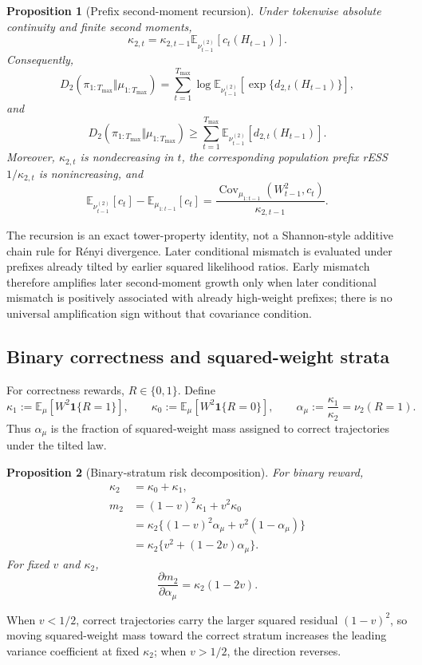 \documentclass[10pt]{article}
\newtheorem{proposition}{Proposition}
\theoremstyle{remark}
\newcommand{\E}{\mathbb{E}}
\newcommand{\Cov}{\operatorname{Cov}}
\newcommand{\ind}{\mathbf{1}}
\begin{document}
\begin{proposition}[Prefix second-moment recursion]
Under tokenwise absolute continuity and finite second moments,
\begin{equation}
\kappa_{2,t}=\kappa_{2,t-1}\E_{\nu_{t-1}^{(2)}}[c_t(H_{t-1})].
\end{equation}
Consequently,
\begin{equation}
D_2(\pi_{1:T_{\max}}\Vert\mu_{1:T_{\max}})
=\sum_{t=1}^{T_{\max}}\log\E_{\nu_{t-1}^{(2)}}[\exp\{d_{2,t}(H_{t-1})\}],
\end{equation}
and
\begin{equation}
D_2(\pi_{1:T_{\max}}\Vert\mu_{1:T_{\max}})
\ge \sum_{t=1}^{T_{\max}}\E_{\nu_{t-1}^{(2)}}[d_{2,t}(H_{t-1})].
\end{equation}
Moreover, $\kappa_{2,t}$ is nondecreasing in $t$, the corresponding population prefix rESS $1/\kappa_{2,t}$ is nonincreasing, and
\begin{equation}
\E_{\nu_{t-1}^{(2)}}[c_t]-\E_{\mu_{1:t-1}}[c_t]
=\frac{\Cov_{\mu_{1:t-1}}(W_{t-1}^2,c_t)}{\kappa_{2,t-1}}.
\end{equation}
\end{proposition}
The recursion is an exact tower-property identity, not a Shannon-style additive chain rule for R\'enyi divergence. Later conditional mismatch is evaluated under prefixes already tilted by earlier squared likelihood ratios. Early mismatch therefore amplifies later second-moment growth only when later conditional mismatch is positively associated with already high-weight prefixes; there is no universal amplification sign without that covariance condition.

\subsection{Binary correctness and squared-weight strata}
For correctness rewards, $R\in\{0,1\}$. Define
\begin{equation}
\kappa_1:=\E_\mu[W^2\ind\{R=1\}],\qquad
\kappa_0:=\E_\mu[W^2\ind\{R=0\}],\qquad
\alpha_\mu:=\frac{\kappa_1}{\kappa_2}=\nu_2(R=1).
\end{equation}
Thus $\alpha_\mu$ is the fraction of squared-weight mass assigned to correct trajectories under the tilted law.

\begin{proposition}[Binary-stratum risk decomposition]
For binary reward,
\begin{align}
\kappa_2&=\kappa_0+\kappa_1,\\
m_2&=(1-v)^2\kappa_1+v^2\kappa_0\\
&=\kappa_2\{(1-v)^2\alpha_\mu+v^2(1-\alpha_\mu)\}\\
&=\kappa_2\{v^2+(1-2v)\alpha_\mu\}.
\end{align}
For fixed $v$ and $\kappa_2$,
\begin{equation}
\frac{\partial m_2}{\partial\alpha_\mu}=\kappa_2(1-2v).
\end{equation}
\end{proposition}
When $v<1/2$, correct trajectories carry the larger squared residual $(1-v)^2$, so moving squared-weight mass toward the correct stratum increases the leading variance coefficient at fixed $\kappa_2$; when $v>1/2$, the direction reverses.
\end{document}
